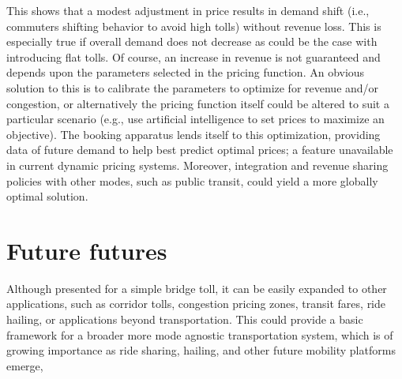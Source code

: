 \documentclass{article}
\begin{document}
This shows that a modest adjustment in price results in demand shift (i.e., commuters shifting behavior to avoid high tolls) without revenue loss. This is especially true if overall demand does not decrease as could be the case with introducing flat tolls. Of course, an increase in revenue is not guaranteed and depends upon the parameters selected in the pricing function. An obvious solution to this is to calibrate the parameters to optimize for revenue and/or congestion, or alternatively the pricing function itself could be altered to suit a particular scenario (e.g., use artificial intelligence to set prices to maximize an objective). The booking apparatus lends itself to this optimization, providing data of future demand to help best predict optimal prices; a feature unavailable in current dynamic pricing systems. Moreover, integration and revenue sharing policies with other modes, such as public transit, could yield a more globally optimal solution. 

\section{Future futures}
Although presented for a simple bridge toll, it can be easily expanded to other applications, such as corridor tolls, congestion pricing zones, transit fares, ride hailing, or applications beyond transportation. This could provide a basic framework for a broader more mode agnostic transportation system, which is of growing importance as ride sharing, hailing, and other future mobility platforms emerge, 
\end{document}
